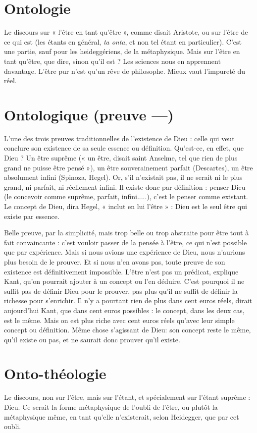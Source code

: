 \section{Ontologie}
Le discours sur « l’être en tant qu'être », comme disait Aristote,
ou sur l’être de ce qui est (les étants en général, {\it ta onta},
et non tel étant en particulier). C’est une partie, sauf pour les heideggériens, de
la métaphysique. Mais sur l’être en tant qu'être, que dire, sinon qu'il est ? Les
sciences nous en apprennent davantage. L’être pur n’est qu’un rêve de philosophe.
Mieux vaut l’impureté du réel.

\section{Ontologique (preuve —)}
L’une des trois preuves traditionnelles de
l'existence de Dieu : celle qui veut conclure
son existence de sa seule essence ou définition. Qu'est-ce, en effet, que Dieu ?
Un être suprême (« un être, disait saint Anselme, tel que rien de plus grand ne
puisse être pensé »), un être souverainement parfait (Descartes), un être absolument
infini (Spinoza, Hegel). Or, s’il n'existait pas, il ne serait ni le plus grand,
ni parfait, ni réellement infini. Il existe donc par définition : penser Dieu (le
concevoir comme suprême, parfait, infini.....), c’est le penser comme existant.
Le concept de Dieu, dira Hegel, « inclut en lui l’être » : Dieu est le seul être qui
existe par essence.

Belle preuve, par la simplicité, mais trop belle ou trop abstraite pour être
tout à fait convaincante : c’est vouloir passer de la pensée à l’être, ce qui n’est
possible que par expérience. Mais si nous avions une expérience de Dieu, nous
n’aurions plus besoin de le prouver. Et si nous n’en avons pas, toute preuve de
son existence est définitivement impossible. L’être n’est pas un prédicat,
explique Kant, qu’on pourrait ajouter à un concept ou l’en déduire. C’est pourquoi
il ne suffit pas de définir Dieu pour le prouver, pas plus qu’il ne suffit de
définir la richesse pour s'enrichir. Il n’y a pourtant rien de plus dans cent euros
réels, dirait aujourd’hui Kant, que dans cent euros possibles : le concept, dans
les deux cas, est le même. Mais on est plus riche avec cent euros réels qu'avec
leur simple concept ou définition. Même chose s'agissant de Dieu: son
concept reste le même, qu’il existe ou pas, et ne saurait donc prouver qu’il
existe.

\section{Onto-théologie}
Le discours, non sur l’être, mais sur l’étant, et spécialement
sur l’étant suprême : Dieu. Ce serait la forme
métaphysique de l’oubli de l'être, ou plutôt la métaphysique même, en tant
qu’elle n’existerait, selon Heidegger, que par cet oubli.

